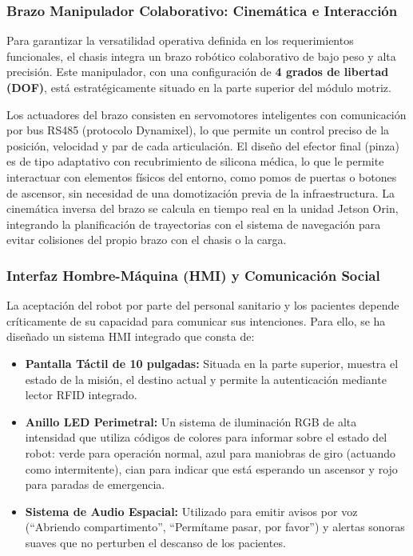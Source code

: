 \subsubsection{Brazo Manipulador Colaborativo: Cinemática e Interacción}
Para garantizar la versatilidad operativa definida en los requerimientos funcionales, el chasis integra un brazo robótico colaborativo de bajo peso y alta precisión. Este manipulador, con una configuración de \textbf{4 grados de libertad (DOF)}, está estratégicamente situado en la parte superior del módulo motriz. 

Los actuadores del brazo consisten en servomotores inteligentes con comunicación por bus RS485 (protocolo Dynamixel), lo que permite un control preciso de la posición, velocidad y par de cada articulación. El diseño del efector final (pinza) es de tipo adaptativo con recubrimiento de silicona médica, lo que le permite interactuar con elementos físicos del entorno, como pomos de puertas o botones de ascensor, sin necesidad de una domotización previa de la infraestructura. La cinemática inversa del brazo se calcula en tiempo real en la unidad Jetson Orin, integrando la planificación de trayectorias con el sistema de navegación para evitar colisiones del propio brazo con el chasis o la carga.

\subsubsection{Interfaz Hombre-Máquina (HMI) y Comunicación Social}
La aceptación del robot por parte del personal sanitario y los pacientes depende críticamente de su capacidad para comunicar sus intenciones. Para ello, se ha diseñado un sistema HMI integrado que consta de:
\begin{itemize}
    \item \textbf{Pantalla Táctil de 10 pulgadas:} Situada en la parte superior, muestra el estado de la misión, el destino actual y permite la autenticación mediante lector RFID integrado.
    \item \textbf{Anillo LED Perimetral:} Un sistema de iluminación RGB de alta intensidad que utiliza códigos de colores para informar sobre el estado del robot: verde para operación normal, azul para maniobras de giro (actuando como intermitente), cian para indicar que está esperando un ascensor y rojo para paradas de emergencia.
    \item \textbf{Sistema de Audio Espacial:} Utilizado para emitir avisos por voz (``Abriendo compartimento'', ``Permítame pasar, por favor'') y alertas sonoras suaves que no perturben el descanso de los pacientes.
\end{itemize}


